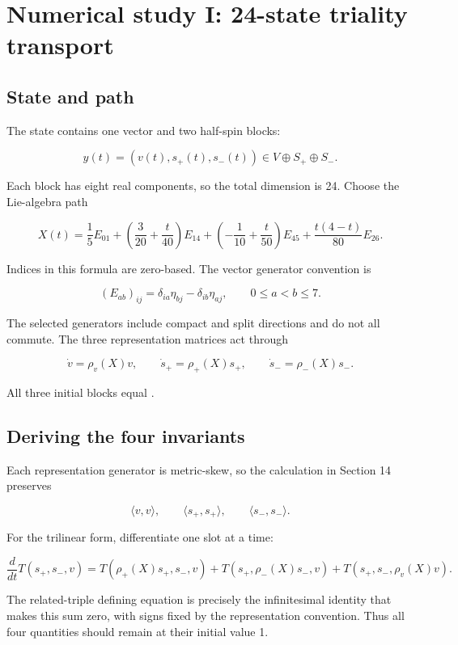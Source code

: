 \documentclass[11pt]{article}
\begin{document}
\section{Numerical study I: 24-state triality transport}

\subsection{State and path}

The state contains one vector and two half-spin blocks:

\[
y(t)=(v(t),s_+(t),s_-(t))\in V\mathbin{\oplus}S_+
\mathbin{\oplus}S_-.
\]

Each block has eight real components, so the total dimension is 24. Choose the Lie-algebra path

\[
X(t)=\frac15E_{01}
+\left(\frac3{20}+\frac{t}{40}\right)E_{14}
+\left(-\frac1{10}+\frac{t}{50}\right)E_{45}
+\frac{t(4-t)}{80}E_{26}.
\]

Indices in this formula are zero-based. The vector generator convention is

\[
(E_{ab})_{ij}=\delta_{ia}\eta_{bj}-\delta_{ib}\eta_{aj},
\qquad 0\le a<b\le7.
\]

The selected generators include compact and split directions and do not all commute. The three representation matrices act through

\[
\dot v=\rho_v(X)v,
\qquad
\dot s_+=\rho_+(X)s_+,
\qquad
\dot s_-=\rho_-(X)s_-.
\]

All three initial blocks equal \texttt{}.

\subsection{Deriving the four invariants}

Each representation generator is metric-skew, so the calculation in Section 14 preserves

\[
\langle v,v\rangle,
\qquad
\langle s_+,s_+\rangle,
\qquad
\langle s_-,s_-\rangle.
\]

For the trilinear form, differentiate one slot at a time:

\[
\frac{d}{dt}T(s_+,s_-,v)
=T(\rho_+(X)s_+,s_-,v)
+T(s_+,\rho_-(X)s_-,v)
+T(s_+,s_-,\rho_v(X)v).
\]

The related-triple defining equation is precisely the infinitesimal identity that makes this sum zero, with signs fixed by the representation convention. Thus all four quantities should remain at their initial value 1.
\end{document}
